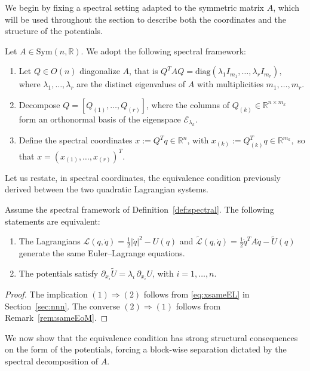 \documentclass{rendiconti}
\begin{document}
We begin by fixing a spectral setting adapted to the symmetric matrix $A$,
which will be used throughout the section to describe both the coordinates
and the structure of the potentials.
\begin{definition}
\label{def:spectral}
Let $A \in \mathrm{Sym}(n,\mathbb{R})$. We adopt the following spectral framework:
\begin{enumerate}
\item Let $Q \in O(n)$ diagonalize $A$, that is
$
Q^T A Q = \mathrm{diag}(\lambda_1 I_{m_1}, \dots, \lambda_r I_{m_r}),
$
where $\lambda_1,\dots,\lambda_r$ are the distinct eigenvalues of $A$ with
multiplicities $m_1,\dots,m_r$.
\item Decompose $Q = [Q_{(1)}, \dots, Q_{(r)}]$, where the columns of
$Q_{(k)} \in \mathbb{R}^{n \times m_k}$ form an orthonormal basis of the eigenspace
$\mathcal{E}_{\lambda_k}$.
\item Define the spectral coordinates $x := Q^T q \in \mathbb{R}^n$, with
$
x_{(k)} := Q_{(k)}^T q \in \mathbb{R}^{m_k},
$
so that $x = (x_{(1)}, \dots, x_{(r)})^T$.
\end{enumerate}
\end{definition}
%
Let us restate, in spectral coordinates, the equivalence condition previously
derived between the two quadratic Lagrangian systems.
%
\begin{proposition}
\label{theo:eq_statmnt}
Assume the spectral framework of Definition~\ref{def:spectral}. The following
statements are equivalent:
\begin{enumerate}
\item
The Lagrangians
$
\mathcal{L}(q,\dot q)=\tfrac12|\dot q|^2-U(q)
$
and
$
\widetilde{\mathcal{L}}(q,\dot q)=\tfrac12 \dot q^T A \dot q-\widetilde U(q)
$
generate the same Euler--Lagrange equations.
\item
The potentials satisfy
$
\partial_{x_i}\widetilde U=\lambda_i\,\partial_{x_i}U$, with $i=1,\dots,n.
$
\end{enumerate}
\end{proposition}
\begin{proof}
The implication $(1)\Rightarrow(2)$ follows from
\eqref{eq:xsameEL} in Section~\ref{sec:nnn}.
The converse $(2)\Rightarrow(1)$ follows from Remark~\ref{rem:sameEoM}.
\end{proof}
%
We now show that the equivalence condition has strong structural consequences
on the form of the potentials, forcing a block-wise separation dictated by
the spectral decomposition of $A$.
\end{document}
